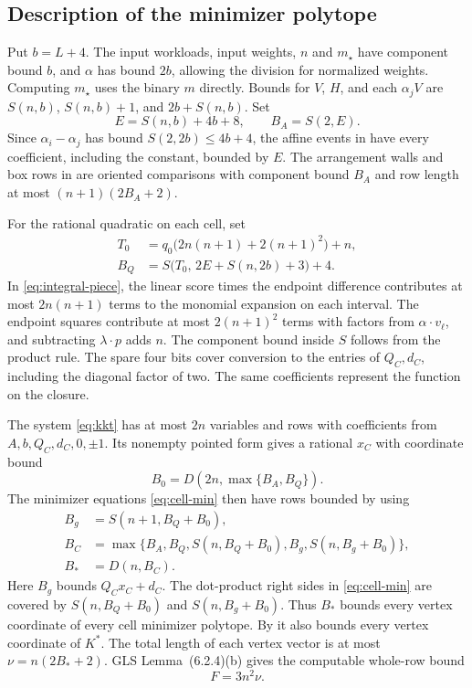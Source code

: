 \subsection{Description of the minimizer polytope}
Put $b=L+4$. The input workloads, input weights, $n$ and $m_\star$ have component bound $b$, and $\alpha$ has bound $2b$, allowing the division for normalized weights. Computing $m_\star$ uses the binary $m$ directly. Bounds for $V$, $H$, and each $\alpha_jV$ are $S(n,b)$, $S(n,b)+1$, and $2b+S(n,b)$. Set
\[
 E=S(n,b)+4b+8,\qquad B_A=S(2,E).
\]
Since $\alpha_i-\alpha_j$ has bound $S(2,2b)\leq4b+4$, the affine events in  have every coefficient, including the constant, bounded by $E$. The arrangement walls and box rows in  are oriented comparisons with component bound $B_A$ and row length at most $(n+1)(2B_A+2)$.

For the rational quadratic on each cell, set
\begin{align*}
 T_0 &= q_0\bigl(2n(n+1)+2(n+1)^2\bigr)+n,\\
 B_Q &= S\bigl(T_0,\,2E+S(n,2b)+3\bigr)+4 .
\end{align*}
In \eqref{eq:integral-piece}, the linear score times the endpoint difference contributes at most $2n(n+1)$ terms to the monomial expansion on each interval. The endpoint squares contribute at most $2(n+1)^2$ terms with factors from $\alpha\cdot v_\ell$, and subtracting $\lambda\cdot p$ adds $n$. The component bound inside $S$ follows from the product rule. The spare four bits cover conversion to the entries of $Q_C,d_C$, including the diagonal factor of two. The same coefficients represent the function on the closure.

The system \eqref{eq:kkt} has at most $2n$ variables and rows with coefficients from $A,b,Q_C,d_C,0,\pm1$. Its nonempty pointed form gives a rational $x_C$ with coordinate bound
\[
 B_0=D(2n,\max\{B_A,B_Q\}).
\]
The minimizer equations \eqref{eq:cell-min} then have rows bounded by using
\begin{align*}
 B_g &= S(n+1,B_Q+B_0),\\
 B_C &= \max\{B_A,B_Q,S(n,B_Q+B_0),B_g,S(n,B_g+B_0)\},\\
 B_* &= D(n,B_C).
\end{align*}
Here $B_g$ bounds $Q_Cx_C+d_C$. The dot-product right sides in \eqref{eq:cell-min} are covered by $S(n,B_Q+B_0)$ and $S(n,B_g+B_0)$. Thus $B_*$ bounds every vertex coordinate of every cell minimizer polytope. By  it also bounds every vertex coordinate of $K^*$. The total length of each vertex vector is at most $\nu=n(2B_*+2)$. GLS Lemma~(6.2.4)(b) \cite[pp.~164--165]{gls1988} gives the computable whole-row bound
\begin{equation}\label{eq:F}
 F=3n^2\nu .
\end{equation}

